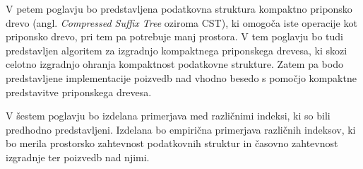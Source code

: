 
V petem poglavju bo predstavljena podatkovna struktura kompaktno priponsko drevo (angl. \textit{Compressed Suffix Tree} oziroma CST), ki omogoča iste operacije kot priponsko drevo, pri tem pa potrebuje manj prostora. V tem poglavju bo tudi predstavljen algoritem za izgradnjo kompaktnega priponskega drevesa, ki skozi celotno izgradnjo ohranja kompaktnost podatkovne strukture. Zatem pa bodo predstavljene implementacije poizvedb nad vhodno besedo s pomočjo kompaktne predstavitve priponskega drevesa.

V šestem poglavju bo izdelana primerjava med različnimi indeksi, ki so bili predhodno predstavljeni. Izdelana bo empirična primerjava različnih indeksov, ki bo merila prostorsko zahtevnost podatkovnih struktur in časovno zahtevnost izgradnje ter poizvedb nad njimi.